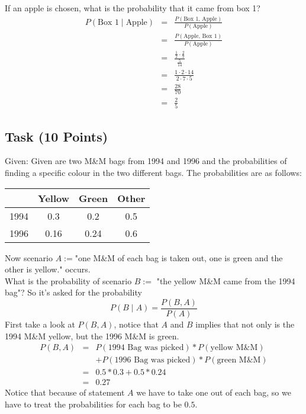 \documentclass{article}
\begin{document}
	If an apple is chosen, what is the probability that it came from box 1?\\
	\begin{eqnarray*}
		P(\text{Box 1} \mid \text{Apple}) &=& \frac{P(\text{Box 1, Apple})}{P(\text{Apple})}\\
		&=& \frac{P(\text{Apple, Box 1})}{P(\text{Apple})}\\
		&=& \frac{\frac{1}{2} \cdot \frac{2}{7}}{\frac{5}{14}}\\
		&=& \frac{1 \cdot 2 \cdot 14}{2 \cdot 7 \cdot 5}\\
		&=& \frac{28}{70}\\
		&=& \frac{2}{5}
	\end{eqnarray*}

	\subsection{Task (10 Points)}
	Given: Given are two M\&M bags from 1994 and 1996 and the probabilities of finding a specific colour in the two different bags. The probabilities are as follows:
	\begin{center}
		\begin{tabular}{ |c|c|c|c| }
			\hline
			& Yellow & Green & Other \\
			\hline
			1994 & 0.3 & 0.2 & 0.5 \\
			\hline
			1996 & 0.16 & 0.24 & 0.6 \\
			\hline
		\end{tabular}
	\end{center}
	Now scenario $A := $"one M\&M of each bag is taken out, one is green and the other is yellow." occurs.\\
	What is the probability of scenario $B := $ "the yellow M\&M came from the 1994 bag"?
	So it's asked for the probability
	\begin{equation*}
		P(B \mid A) = \frac{P(B, A)}{P(A)}
	\end{equation*}
	First take a look at $P(B, A)$, notice that $A$ and $B$ implies that not only is the 1994 M\&M yellow, but the 1996 M\&M is green.
	\begin{eqnarray*}
		P(B, A) &=& P(\text{1994 Bag was picked}) * P(\text{yellow M\&M})\\
		&&+ P(\text{1996 Bag was picked}) * P(\text{green M\&M})\\
		&=& 0.5 * 0.3 + 0.5 * 0.24\\
		&=& 0.27
	\end{eqnarray*}
	Notice that because of statement $A$ we have to take one out of each bag, so we have to treat the probabilities for each bag to be $0.5$.
\end{document}
